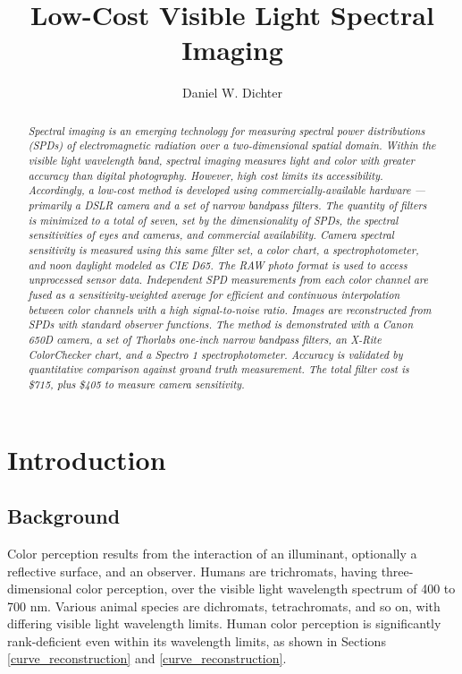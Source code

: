 \documentclass[twocolumn,10pt]{asme2ej}
\title{Low-Cost Visible Light Spectral Imaging}
\author{Daniel W. Dichter
    \affiliation{
Independent Researcher\\
Cambridge, Massachusetts, U.S.A.\\
daniel.w.dichter@gmail.com\\
\\
\color{red}
\emph{\textbf{DRAFT: \today}}\\
\color{black}

    }	
}
\begin{document}
\maketitle

\pagestyle{fancy}

\begin{abstract}{\it Spectral imaging is an emerging technology for measuring spectral power distributions (SPDs) of electromagnetic radiation over a two-dimensional spatial domain. Within the visible light wavelength band, spectral imaging measures light and color with greater accuracy than digital photography. However, high cost limits its accessibility. Accordingly, a low-cost method is developed using commercially-available hardware --- primarily a DSLR camera and a set of narrow bandpass filters. The quantity of filters is minimized to a total of seven, set by the dimensionality of SPDs, the spectral sensitivities of eyes and cameras, and commercial availability. Camera spectral sensitivity is measured using this same filter set, a color chart, a spectrophotometer, and noon daylight modeled as CIE D65. The RAW photo format is used to access unprocessed sensor data. Independent SPD measurements from each color channel are fused as a sensitivity-weighted average for efficient and continuous interpolation between color channels with a high signal-to-noise ratio. Images are reconstructed from SPDs with standard observer functions. The method is demonstrated with a Canon 650D camera, a set of Thorlabs one-inch narrow bandpass filters, an X-Rite ColorChecker chart, and a Spectro 1 spectrophotometer. Accuracy is validated by quantitative comparison against ground truth measurement. The total filter cost is \$715, plus \$405 to measure camera sensitivity.}
\end{abstract}

\section{Introduction}

\subsection{Background}


Color perception results from the interaction of an illuminant, optionally a reflective surface, and an observer. Humans are trichromats, having three-dimensional color perception, over the visible light wavelength spectrum of 400 to 700 nm. Various animal species are dichromats, tetrachromats, and so on, with differing visible light wavelength limits. Human color perception is significantly rank-deficient even within its wavelength limits, as shown in Sections \ref{curve_reconstruction} and \ref{curve_reconstruction}.
\end{document}
